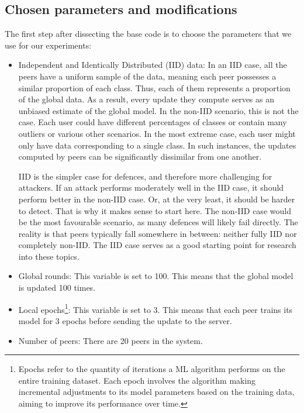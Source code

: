 \subsection{Chosen parameters and modifications}\label{sec:chosen_parameters}
The first step after dissecting the base code \cite{LFighter_code} is to choose the parameters that we use for our experiments:
\begin{itemize}
        \item Independent and Identically Distributed (IID) data: In an IID case, all the peers have a uniform sample of the data, meaning each peer possesses a similar proportion of each class. Thus, each of them represents a proportion of the global data. As a result, every update they compute serves as an unbiased estimate of the global model. In the non-IID scenario, this is not the case. Each user could have different percentages of classes or contain many outliers or various other scenarios. In the most extreme case, each user might only have data corresponding to a single class. In such instances, the updates computed by peers can be significantly dissimilar from one another. 
        
        IID is the simpler case for defences, and therefore more challenging for attackers. If an attack performs moderately well in the IID case, it should perform better in the non-IID case. Or, at the very least, it should be harder to detect. That is why it makes sense to start here. The non-IID case would be the most favourable scenario, as many defences will likely fail directly. The reality is that peers typically fall somewhere in between: neither fully IID nor completely non-IID. The IID case serves as a good starting point for research into these topics.
        \item Global rounds: This variable is set to 100. This means that the global model is updated 100 times.
        \item Local epochs\footnote{Epochs refer to the quantity of iterations a ML algorithm performs on the entire training dataset. Each epoch involves the algorithm making incremental adjustments to its model parameters based on the training data, aiming to improve its performance over time.}: This variable is set to 3. This means that each peer trains its model for 3 epochs before sending the update to the server.
        \item Number of peers: There are 20 peers in the system. 
\end{itemize}
